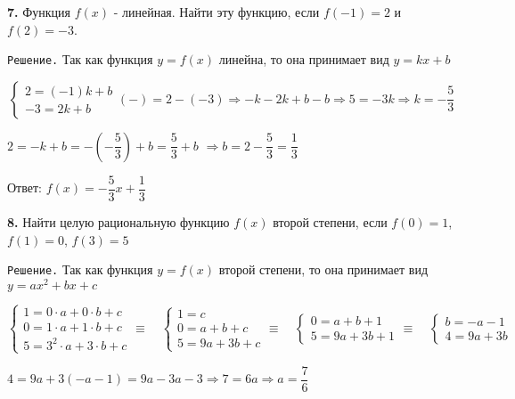 \documentclass[12pt]{article}
\begin{document}
{\bf 7.} Функция $f(x)$ - линейная. Найти эту функцию, если $f(-1) = 2$ и $f(2)=-3$.

{\tt Решение.} Так как функция $y=f(x)$ линейна, то она принимает вид $y = kx+b$

\begin{equation*}
	\begin{cases*}
		2 = (-1)k+b \\
		-3 = 2k +b
	\end{cases*} (-) =  2-(-3) \Longrightarrow -k-2k+b-b \Longrightarrow 5 = -3k \Longrightarrow k =-\frac{5}{3}
\end{equation*}

$2 = -k +b = -(-\dfrac{5}{3}) +b= \dfrac{5}{3}+b$ \quad$\Longrightarrow$\quad $b = 2-\dfrac{5}{3} = \dfrac{1}{3}$

\vspace{2mm}\hspace{-4mm}Ответ: $f(x) = -\dfrac{5}{3}x+\dfrac{1}{3}$\vspace{2mm}

{\bf 8.} Найти целую рациональную функцию $f(x)$ второй степени, если $f(0) =1$, $f(1)=0$, $f(3) = 5$

{\tt Решение.} Так как функция $y =f(x)$ второй степени, то она принимает вид $y=ax^2+bx+c$

\begin{equation*}
	\begin{cases}
		1 = 0\cdot a +0\cdot b+c \\
		0 = 1\cdot a +1\cdot b +c \\
		5 = 3^2\cdot a+3\cdot b+c
	\end{cases} \equiv \quad
	\begin{cases}
		1 = c \\
		0 = a+b+c \\
		5 = 9a+3b+c
	\end{cases} \equiv\quad
	\begin{cases}
		0 = a+b+1 \\
		5 = 9a+3b+1
	\end{cases} \equiv\quad
	\begin{cases}
		b = -a-1\\
		4 = 9a+3b
	\end{cases}
\end{equation*}

$4 = 9a +3(-a-1) = 9a -3a-3$\quad$\Longrightarrow$\quad $7 = 6a$\quad$\Longrightarrow$\quad $a = \dfrac{7}{6}$\vspace{2mm}
\end{document}
